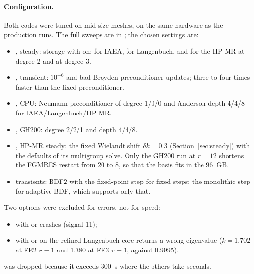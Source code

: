 \paragraph{Configuration.} Both codes were tuned on mid-size meshes, on the
same hardware as the production runs. The full sweeps are in
; the chosen settings are:
\begin{itemize}
\item \ffn{}, steady:  storage with  on;
   for IAEA,  for Langenbuch, and for the HP-MR
   at degree 2 and  at degree 3.
\item \ffn{}, transient:  $10^{-6}$ and bad-Broyden
  preconditioner updates; three to four times faster than the fixed
  preconditioner.
\item \garnet{}, CPU: Neumann preconditioner of degree 1/0/0 and Anderson
  depth 4/4/8 for IAEA/Langenbuch/HP-MR.
\item \garnet{}, GH200: degree 2/2/1 and depth 4/4/8.
\item \garnet{}, HP-MR steady: the fixed Wielandt shift $\delta k = 0.3$
  (Section~\ref{sec:steady}) with the defaults of its multigroup solve. Only
  the GH200 run at $r=12$ shortens the FGMRES restart from 20 to 8, so that
  the basis fits in the 96~GB.
\item \garnet{} transients: BDF2 with the fixed-point step for fixed steps;
  the monolithic step for adaptive BDF, which supports only that.
\end{itemize}
Two \ffn{} options were excluded for errors, not for speed:
\begin{itemize}
\item {} with  or  crashes
  (signal 11);
\item {} with  or  on the refined
  Langenbuch core returns a wrong eigenvalue ($k = 1.702$ at FE2 $r=1$ and
  1.380 at FE3 $r=1$, against 0.9995).
\end{itemize}
 was dropped because it exceeds 300~s where the others take
seconds.

